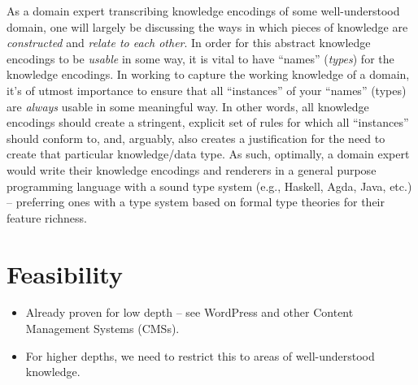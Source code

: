 As a domain expert transcribing knowledge encodings of some well-understood
domain, one will largely be discussing the ways in which pieces of knowledge are
\textit{constructed} and \textit{relate to each other}. In order for this
abstract knowledge encodings to be \textit{usable} in some way, it is vital to
have ``names'' (\textit{types}) for the knowledge encodings. In working to
capture the working knowledge of a domain, it's of utmost importance to ensure
that all ``instances'' of your ``names'' (types) are \textit{always} usable in
some meaningful way. In other words, all knowledge encodings should create a
stringent, explicit set of rules for which all ``instances'' should conform to,
and, arguably, also creates a justification for the need to create that
particular knowledge/data type. As such, optimally, a domain expert would write
their knowledge encodings and renderers in a general purpose programming
language with a sound type system (e.g., Haskell, Agda, Java, etc.) --
preferring ones with a type system based on formal type theories for their
feature richness.

\section{Feasibility}\label{sec:idlgy:feasibility}

\begin{itemize}

    \item Already proven for low depth -- see WordPress and other
          Content Management Systems (CMSs).

    \item For higher depths, we need to restrict this to areas of
          well-understood knowledge.

\end{itemize}
